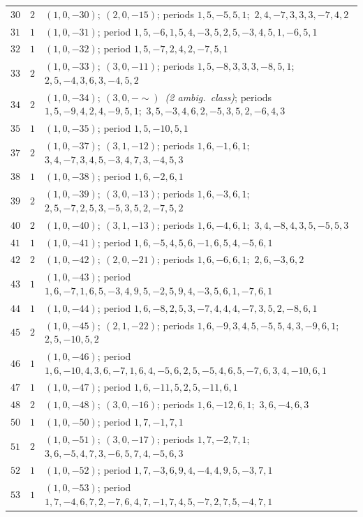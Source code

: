 \documentclass[11pt,a4paper]{article}
\theoremstyle{plain}
\begin{document}
\begin{longtable}{r|c|p{}}
$30$ & $2$ & $(1,0,-30);\ (2,0,-15)$; periods $1,5,-5,5,1$;\ $2,4,-7,3,3,3,-7,4,2$ \\
$31$ & $1$ & $(1,0,-31)$; period $1,5,-6,1,5,4,-3,5,2,5,-3,4,5,1,-6,5,1$ \\
$32$ & $1$ & $(1,0,-32)$; period $1,5,-7,2,4,2,-7,5,1$ \\
$33$ & $2$ & $(1,0,-33);\ (3,0,-11)$; periods $1,5,-8,3,3,3,-8,5,1$;\ $2,5,-4,3,6,3,-4,5,2$ \\
$34$ & $2$ & $(1,0,-34);\ (3,0,-\!\sim)$\ \textit{(2 ambig.\ class)}; periods $1,5,-9,4,2,4,-9,5,1$;\ $3,5,-3,4,6,2,-5,3,5,2,-6,4,3$ \\
$35$ & $1$ & $(1,0,-35)$; period $1,5,-10,5,1$ \\
$37$ & $2$ & $(1,0,-37);\ (3,1,-12)$; periods $1,6,-1,6,1$;\ $3,4,-7,3,4,5,-3,4,7,3,-4,5,3$ \\
$38$ & $1$ & $(1,0,-38)$; period $1,6,-2,6,1$ \\
$39$ & $2$ & $(1,0,-39);\ (3,0,-13)$; periods $1,6,-3,6,1$;\ $2,5,-7,2,5,3,-5,3,5,2,-7,5,2$ \\
$40$ & $2$ & $(1,0,-40);\ (3,1,-13)$; periods $1,6,-4,6,1$;\ $3,4,-8,4,3,5,-5,5,3$ \\
$41$ & $1$ & $(1,0,-41)$; period $1,6,-5,4,5,6,-1,6,5,4,-5,6,1$ \\
$42$ & $2$ & $(1,0,-42);\ (2,0,-21)$; periods $1,6,-6,6,1$;\ $2,6,-3,6,2$ \\
$43$ & $1$ & $(1,0,-43)$; period $1,6,-7,1,6,5,-3,4,9,5,-2,5,9,4,-3,5,6,1,-7,6,1$ \\
$44$ & $1$ & $(1,0,-44)$; period $1,6,-8,2,5,3,-7,4,4,4,-7,3,5,2,-8,6,1$ \\
$45$ & $2$ & $(1,0,-45);\ (2,1,-22)$; periods $1,6,-9,3,4,5,-5,5,4,3,-9,6,1$;\ $2,5,-10,5,2$ \\
$46$ & $1$ & $(1,0,-46)$; period $1,6,-10,4,3,6,-7,1,6,4,-5,6,2,5,-5,4,6,5,-7,6,3,4,-10,6,1$ \\
$47$ & $1$ & $(1,0,-47)$; period $1,6,-11,5,2,5,-11,6,1$ \\
$48$ & $2$ & $(1,0,-48);\ (3,0,-16)$; periods $1,6,-12,6,1$;\ $3,6,-4,6,3$ \\
$50$ & $1$ & $(1,0,-50)$; period $1,7,-1,7,1$ \\
$51$ & $2$ & $(1,0,-51);\ (3,0,-17)$; periods $1,7,-2,7,1$;\ $3,6,-5,4,7,3,-6,5,7,4,-5,6,3$ \\
$52$ & $1$ & $(1,0,-52)$; period $1,7,-3,6,9,4,-4,4,9,5,-3,7,1$ \\
$53$ & $1$ & $(1,0,-53)$; period $1,7,-4,6,7,2,-7,6,4,7,-1,7,4,5,-7,2,7,5,-4,7,1$ \\

\end{longtable}
\end{document}
